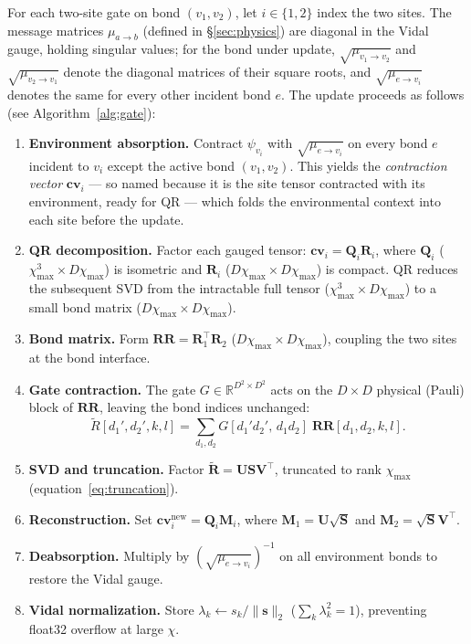 \documentclass[11pt]{article}
\newcommand{\chimax}{\chi_{\mathrm{max}}}
\begin{document}
For each two-site gate on bond $(v_1, v_2)$, let $i \in \{1,2\}$ index the two
sites. The message matrices $\mu_{a\to b}$ (defined in \S\ref{sec:physics}) are
diagonal in the Vidal gauge, holding singular values; for the bond under
update, $\sqrt{\mu_{v_1\to v_2}}$ and $\sqrt{\mu_{v_2\to v_1}}$ denote the
diagonal matrices of their square roots, and $\sqrt{\mu_{e\to v_i}}$ denotes
the same for every other incident bond $e$.
The update proceeds as follows (see Algorithm~\ref{alg:gate}):
\begin{enumerate}
  \item \textbf{Environment absorption.} Contract $\psi_{v_i}$ with
        $\sqrt{\mu_{e \to v_i}}$ on every bond $e$ incident to $v_i$ except the
        active bond $(v_1,v_2)$. This yields the \emph{contraction vector}
        $\mathbf{cv}_i$ — so named because it is the site tensor contracted
        with its environment, ready for QR — which folds the environmental
        context into each site before the update.
  \item \textbf{QR decomposition.} Factor each gauged tensor:
        $\mathbf{cv}_i = \mathbf{Q}_i \mathbf{R}_i$,
        where $\mathbf{Q}_i$ ($\chimax^3 \times D\chimax$) is isometric and
        $\mathbf{R}_i$ ($D\chimax \times D\chimax$) is compact.
        QR reduces the subsequent SVD from the intractable full tensor
        ($\chimax^3 \times D\chimax$) to a small bond matrix ($D\chimax \times D\chimax$).
  \item \textbf{Bond matrix.} Form $\mathbf{RR} = \mathbf{R}_1^\top \mathbf{R}_2$
        ($D\chimax \times D\chimax$), coupling the two sites at the bond interface.
  \item \textbf{Gate contraction.} The gate $G \in \mathbb{R}^{D^2 \times D^2}$
        acts on the $D \times D$ physical (Pauli) block of $\mathbf{RR}$,
        leaving the bond indices unchanged:
        \[
          \tilde{R}[d_1',d_2',k,l]
          = \sum_{d_1,d_2} G[d_1'd_2',\,d_1d_2]\;\mathbf{RR}[d_1,d_2,k,l].
        \]
  \item \textbf{SVD and truncation.} Factor
        $\tilde{\mathbf{R}} = \mathbf{U}\mathbf{S}\mathbf{V}^\top$,
        truncated to rank $\chimax$ (equation~\eqref{eq:truncation}).
  \item \textbf{Reconstruction.} Set $\mathbf{cv}_i^{\text{new}} = \mathbf{Q}_i \mathbf{M}_i$,
        where $\mathbf{M}_1 = \mathbf{U}\sqrt{\mathbf{S}}$ and
        $\mathbf{M}_2 = \sqrt{\mathbf{S}}\mathbf{V}^\top$.
  \item \textbf{Deabsorption.} Multiply by $(\sqrt{\mu_{e\to v_i}})^{-1}$ on all
        environment bonds to restore the Vidal gauge.
  \item \textbf{Vidal normalization.} Store
        $\lambda_k \leftarrow s_k/\|\mathbf{s}\|_2$ ($\sum_k \lambda_k^2 = 1$),
        preventing float32 overflow at large $\chi$.
\end{enumerate}
\end{document}
